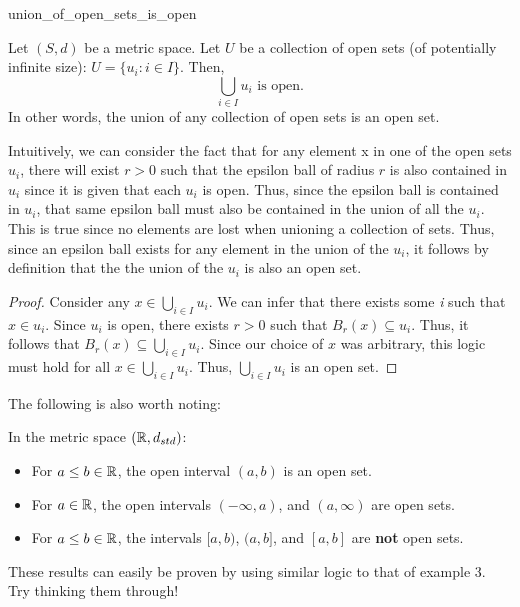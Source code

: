 \begin{thm}{}{union_of_open_sets_is_open}

Let \((S, d)\) be a metric space. Let \(U\) be a collection of open sets (of potentially infinite size): \(U = \{u_i : i \in I\}\). Then,
	\begin{equation*}
  		\bigcup_{i \in I}u_i \textrm{ is open.}
	\end{equation*}
In other words, the union of any collection of open sets is an open set.
\newline 

Intuitively, we can consider the fact that for any element x in one of the open sets \(u_i\), there will exist \(r > 0\) such that the epsilon ball of radius \(r\) is also contained in \(u_i\) since it is given that each \(u_i\) is open. Thus, since the epsilon ball is contained in \(u_i\), that same epsilon ball must also be contained in the union of all the \(u_i\). This is true since no elements are lost when unioning a collection of sets. Thus, since an epsilon ball exists for any element in the union of the \(u_i\), it follows by definition that the the union of the \(u_i\) is also an open set.
\begin{proof}
Consider any \(x \in \bigcup_{i \in I}u_i\). We can infer that there exists some \textit{i} such that \(x \in u_i\). Since \(u_i\) is open, there exists \(r > 0\) such that \(B_r(x) \subseteq u_i\). Thus, it follows that \(B_r(x) \subseteq \bigcup_{i \in I}u_i\). Since our choice of \(x\) was arbitrary, this logic must hold for all \(x \in \bigcup_{i \in I}u_i\). Thus, \(\bigcup_{i \in I}u_i\) is an open set.
\end{proof}

\end{thm}
The following is also worth noting: \newline 
\begin{exmp}{}{}
In the metric space \(({\mathbb R}, d_{std})\):
\begin{itemize}
  \item For \(a \leq b \in {\mathbb R}\), the open interval \((a, b)\) is an open set.
  \item For \(a \in {\mathbb R}\), the open intervals \((- \infty, a)\), and \((a, \infty)\) are open sets.
  \item For \(a \leq b \in {\mathbb R}\), the intervals \([a, b)\), \((a, b]\), and \([a, b]\) are \textbf{not} open sets.
\end{itemize}
These results can easily be proven by using similar logic to that of example 3. Try thinking them through!
\end{exmp}



